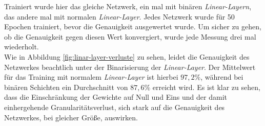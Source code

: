 Trainiert wurde hier das gleiche Netzwerk, ein mal mit binären \textit{Linear-Layern}, das andere mal mit normalen \textit{Linear-Layer}. Jedes Netzwerk wurde für 50 Epochen trainiert, bevor die Genauigkeit ausgewertet wurde. Um sicher zu gehen, ob die Genauigkeit gegen diesen Wert konvergiert, wurde jede Messung drei mal wiederholt.\\
Wie in Abbildung \ref{fig:linar-layer-verluste} zu sehen, leidet die Genauigkeit des Netzwerkes beachtlich unter der Binarisierung der \textit{Linear-Layer}. Der Mittelwert für das Training mit normalem \textit{Linear-Layer} ist hierbei $97,2\%$, während bei binären Schichten ein Durchschnitt von $87,6\%$ erreicht wird. Es ist klar zu sehen, dass die Einschränkung der Gewichte auf Null und Eins und der damit einhergehende Granularitätsverlust, sich stark auf die Genauigkeit des Netzwerkes, bei gleicher Größe, auswirken. 
